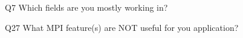 \begin{description}%
\item{Q7} Which fields are you mostly working in?%
\item{Q27} What MPI feature(s) are NOT useful for you application?%
\end{description}%
